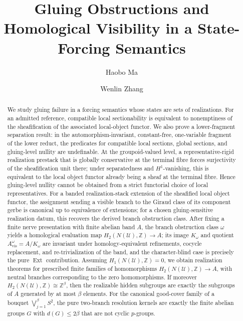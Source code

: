 \documentclass[reqno]{amsart}
\title[Gluing Obstructions and Homological Visibility]{Gluing Obstructions and Homological Visibility in a State-Forcing Semantics}
\author{Haobo Ma}
\author{Wenlin Zhang}
\theoremstyle{definition}
\theoremstyle{remark}
\begin{document}
\begin{abstract}
We study gluing failure in a forcing semantics whose states are sets of realizations. For an admitted reference, compatible local sectionability is equivalent to nonemptiness of the sheafification of the associated local-object functor. We also prove a lower-fragment separation result: in the automorphism-invariant, constant-free, one-variable fragment of the lower reduct, the predicates for compatible local sections, global sections, and gluing-level nullity are undefinable. At the groupoid-valued level, a representative-rigid realization prestack that is globally conservative at the terminal fibre forces surjectivity of the sheafification unit there; under separatedness and $H^1$-vanishing, this is equivalent to the local object functor already being a sheaf at the terminal fibre. Hence gluing-level nullity cannot be obtained from a strict functorial choice of local representatives. For a banded realization-stack extension of the sheafified local object functor, the assignment sending a visible branch to the Giraud class of its component gerbe is canonical up to equivalence of extensions; for a chosen gluing-sensitive realization datum, this recovers the derived branch obstruction class. After fixing a finite nerve presentation with finite abelian band $A$, the branch obstruction class $\omega$ yields a homological evaluation map $H_2(N(\mathcal U),\mathbb Z)\to A$; its image $K_\omega$ and quotient $A_{\mathrm{vis}}^\omega=A/K_\omega$ are invariant under homology-equivalent refinements, cocycle replacement, and re-trivialization of the band, and the character-blind case is precisely the pure $\operatorname{Ext}$ contribution. Assuming $H_1(N(\mathcal U),\mathbb Z)=0$, we obtain realization theorems for prescribed finite families of homomorphisms $H_2(N(\mathcal U),\mathbb Z)\to A$, with neutral branches corresponding to the zero homomorphisms. If moreover $H_2(N(\mathcal U),\mathbb Z)\cong \mathbb Z^\beta$, then the realizable hidden subgroups are exactly the subgroups of $A$ generated by at most $\beta$ elements. For the canonical good-cover family of a bouquet $\bigvee_{j=1}^{\beta}S^2$, the pure two-branch resolution kernels are exactly the finite abelian groups $G$ with $d(G)\le 2\beta$ that are not cyclic $p$-groups.
\end{abstract}


\maketitle














\end{document}
